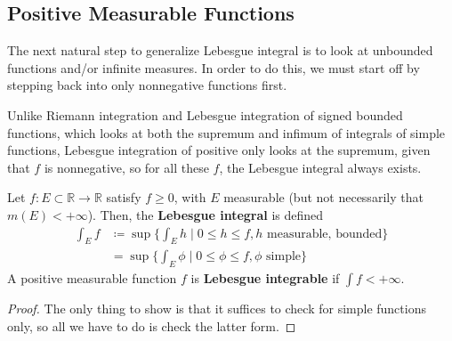 \subsection{Positive Measurable Functions} 

  The next natural step to generalize Lebesgue integral is to look at unbounded functions and/or infinite measures. In order to do this, we must start off by stepping back into only nonnegative functions first.

  Unlike Riemann integration and Lebesgue integration of signed bounded functions, which looks at both the supremum and infimum of integrals of simple functions, Lebesgue integration of positive only looks at the supremum, given that $f$ is nonnegative, so for all these $f$, the Lebesgue integral always exists. 

  \begin{definition}
    Let $f: E \subset \mathbb{R} \to \mathbb{R}$ satisfy $f \geq 0$, with $E$ measurable (but not necessarily that $m(E) < +\infty$). Then, the \textbf{Lebesgue integral} is defined 
    \begin{align}
      \int_E f & \coloneqq \sup \bigg\{ \int_E h \; \bigg| \; 0 \leq h \leq f, h \text{ measurable, bounded} \bigg\} \\ 
               & = \sup \bigg\{ \int_E \phi \; \bigg| \; 0 \leq \phi \leq f, \phi \text{ simple} \bigg\}
    \end{align}
    A positive measurable function $f$ is \textbf{Lebesgue integrable} if $\int f < +\infty$. 
  \end{definition}
  \begin{proof}
    The only thing to show is that it suffices to check for simple functions only, so all we have to do is check the latter form. 
  \end{proof} 


